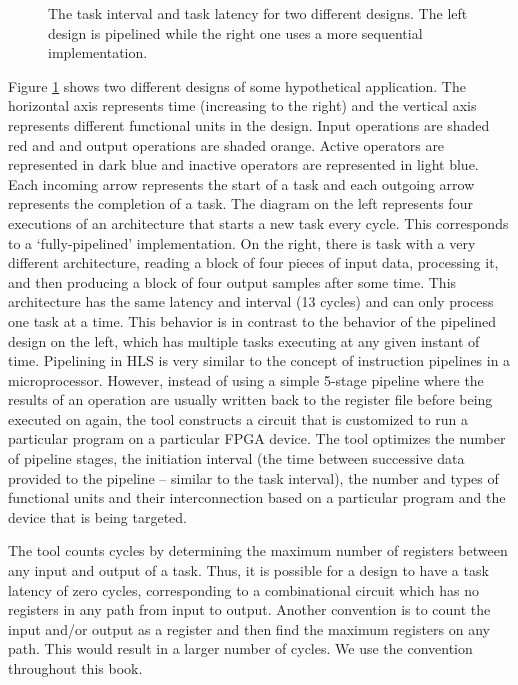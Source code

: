 \begin{figure}
\centering
\def\svgwidth{\columnwidth}

\caption{The task interval and task latency for two different designs. The left design is pipelined while the right one uses a more sequential implementation.}
\label{fig:intervalDuration}
\end{figure}

Figure \ref{fig:intervalDuration} shows two different designs of some hypothetical application.   The horizontal axis represents time (increasing to the right) and the vertical axis represents different functional units in the design.  Input operations are shaded red and and output operations are shaded orange.  Active operators are represented in dark blue and inactive operators are represented in light blue.  Each incoming arrow represents the start of a task and each outgoing arrow represents the completion of a task.  The diagram on the left represents four executions of an architecture that starts a new task every cycle. This corresponds to a `fully-pipelined' implementation. On the right, there is task with a very different architecture, reading a block of four pieces of input data, processing it, and then producing a block of four output samples after some time.  This architecture has the same latency and interval (13 cycles) and can only process one task at a time.  This behavior is in contrast to the behavior of the pipelined design on the left, which has multiple tasks executing at any given instant of time.  Pipelining in HLS is very similar to the concept of instruction pipelines in a microprocessor.  However, instead of using a simple 5-stage pipeline where the results of an operation are usually written back to the register file before being executed on again, the \VHLS tool constructs a circuit that is customized to run a particular program on a particular FPGA device.  The tool optimizes the number of pipeline stages, the initiation interval (the time between successive data provided to the pipeline -- similar to the task interval), the number and types of functional units and their interconnection based on a particular program and the device that is being targeted.

The \VHLS tool counts cycles by determining the maximum number of registers between any input and output of a task. Thus, it is possible for a design to have a task latency of zero cycles, corresponding to a combinational circuit which has no registers in any path from input to output. Another convention is to count the input and/or output as a register and then find the maximum registers on any path. This would result in a larger number of cycles. We use the \VHLS convention throughout this book.

